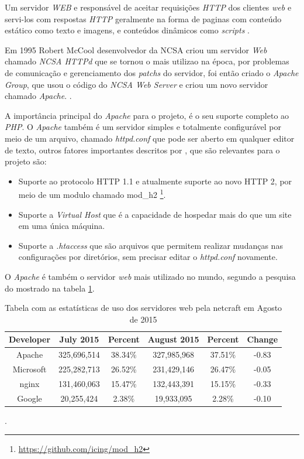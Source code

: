 Um servidor \textit{WEB} e responsável de aceitar requisições \textit{HTTP} dos clientes \textit{web} e servi-los com respostas \textit{HTTP} geralmente na forma de paginas com conteúdo estático como texto e imagens, e conteúdos dinâmicos como \textit{scripts} \cite[p.~15]{igor}.
\par
Em 1995 Robert McCool desenvolvedor da \ac{NCSA} criou um servidor \textit{Web} chamado \textit{NCSA HTTPd} que se tornou o mais utilizao na época, por problemas de comunicação e gerenciamento dos \textit{patchs} do servidor, foi então criado o \textit{Apache Group}, que usou o código do \textit{NCSA Web Server} e criou um novo servidor chamado \textit{Apache}. \cite[p.~36]{kabir}.
\par
A importância principal do \textit{Apache} para o projeto, é o seu suporte completo ao \textit{PHP}. O \textit{Apache} também é um servidor simples e totalmente configurável por meio de um arquivo,  chamado \textit{httpd.conf} que pode ser aberto em qualquer editor de texto, outros fatores importantes descritos por \cite[p.~38]{kabir}, que são relevantes para o projeto são:
\begin{itemize}
    \item Suporte ao protocolo HTTP 1.1 e atualmente suporte ao novo HTTP 2, por meio de um modulo chamado mod\_h2 \footnote{\url{https://github.com/icing/mod_h2}}.
    \item Suporte a \textit{Virtual Host} que é a capacidade de hospedar mais do que um site em uma única máquina.
    \item Suporte a \textit{.htaccess} que são arquivos que permitem realizar mudanças nas configurações por diretórios, sem precisar editar o \textit{httpd.conf} novamente.
\end{itemize}
\par
O \textit{Apache} é também o servidor \textit{web} mais utilizado no mundo, segundo a pesquisa do  mostrado na tabela \ref{tbl:netcraft}.

\begin{table}[h!]
    \begin{tabular}{|c|c|c|c|c|c|}
        \hline \textbf{Developer} & \textbf{July 2015} & \textbf{Percent} & \textbf{August 2015} & \textbf{Percent} & \textbf{Change} \\ 
        \hline Apache & 325,696,514 & 38.34\% & 327,985,968 & 37.51\% & -0.83 \\ 
        \hline Microsoft & 225,282,713 & 26.52\% & 231,429,146 & 26.47\% & -0.05 \\ 
        \hline nginx & 131,460,063 & 15.47\% & 132,443,391 & 15.15\% & -0.33 \\ 
        \hline Google & 20,255,424 & 2.38\% & 19,933,095 & 2.28\% & -0.10 \\ 
    \end{tabular}
    \caption{Tabela com as estatísticas de uso dos servidores web pela netcraft em Agosto de 2015}.
    \label{tbl:netcraft}
\end{table}

